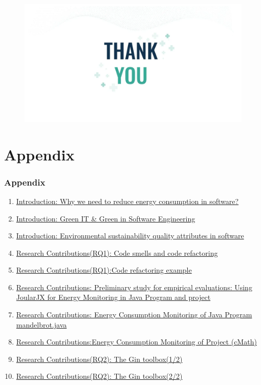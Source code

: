 \documentclass{beamer}
\newcommand{\backupend}{
   \addtocounter{framenumbervorappendix}{-\value{framenumber}}
   \addtocounter{framenumber}{\value{framenumbervorappendix}} 
}
\begin{document}
\begin{frame}
\frametitle{}
    \begin{figure}
    \centering
        \includegraphics[width=1\textwidth]{figures/Slide_22(Thank_you).png}
   \end{figure}

\end{frame}
\backupend

\appendix
\section{Appendix}
\begin{frame}
\frametitle{Appendix}
\vspace{-1.8cm}
\begin{enumerate}
    \item[]\footnotesize{\hyperlink{Intro_11}{Introduction: Why we need to reduce energy consumption in software?}}
    \item[]\footnotesize{\hyperlink{Intro_1}{Introduction: Green IT \& Green in Software Engineering}}
    \item[]\footnotesize{\hyperlink{Intro_2}{Introduction: Environmental sustainability quality attributes in software}}
    \item[]\footnotesize{\hyperlink{Research Contributions_1}{Research Contributions(RQ1): Code smells and code refactoring}}
    \item[]\footnotesize{\hyperlink{codeRefactorSlide}{Research Contributions(RQ1):Code refactoring example}}
    \item[]\footnotesize{\hyperlink{Preliminary_study}{Research Contributions: Preliminary study for empirical evaluations: Using JoularJX for Energy Monitoring in Java Program and project}}
    \item[]\footnotesize{\hyperlink{Energy_Consumption}{Research Contributions: Energy Consumption Monitoring of Java Program mandelbrot.java}}
    \item[]\footnotesize{\hyperlink{Energy_Consumption_cMath}{Research Contributions:Energy Consumption Monitoring of Project (cMath)}}
    \item[]\footnotesize{\hyperlink{Gin_toolbox}{Research Contributions(RQ2): The Gin toolbox(1/2)}}
    \item[]\footnotesize{\hyperlink{Gin_toolbox_2}{Research Contributions(RQ2): The Gin toolbox(2/2)}}
\end{enumerate}
\end{frame}
\end{document}
